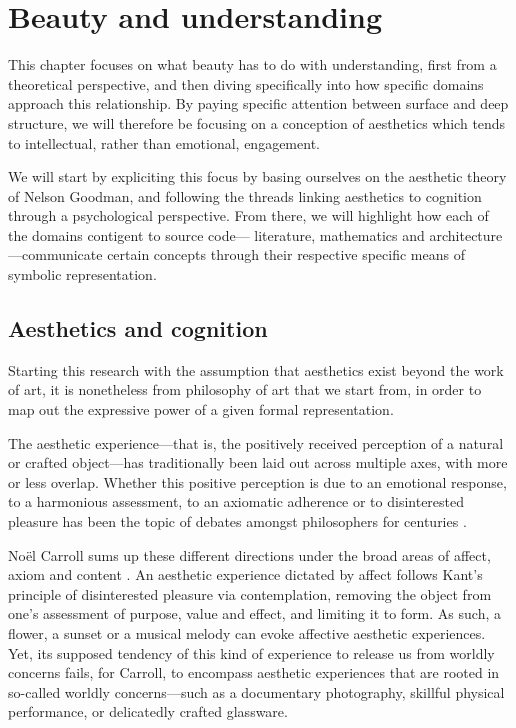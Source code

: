\chapter{Beauty and understanding}
\label{chap:beauty}


This chapter focuses on what beauty has to do with understanding, first from a theoretical perspective, and then diving specifically into how specific domains approach this relationship.  By paying specific attention between surface and deep structure, we will therefore be focusing on a conception of aesthetics which tends to intellectual, rather than emotional, engagement.

We will start by expliciting this focus by basing ourselves on the aesthetic theory of Nelson Goodman, and following the threads linking aesthetics to cognition through a psychological perspective. From there, we will highlight how each of the domains contigent to source code— literature, mathematics and architecture—communicate certain concepts through their respective specific means of symbolic representation.

\section{Aesthetics and cognition}
\label{sec:aesthetic-cognition}


Starting this research with the assumption that aesthetics exist beyond the work of art, it is nonetheless from philosophy of art that we start from, in order to map out the expressive power of a given formal representation. 

The aesthetic experience—that is, the positively received perception of a natural or crafted object—has traditionally been laid out across multiple axes, with more or less overlap. Whether this positive perception is due to an emotional response, to a harmonious assessment, to an axiomatic adherence or to disinterested pleasure has been the topic of debates amongst philosophers for centuries \citep{peacocke_aesthetic_2023}.

Noël Carroll sums up these different directions under the broad areas of affect, axiom and content \citep{carroll_aesthetic_2002}. An aesthetic experience dictated by affect follows Kant's principle of disinterested pleasure via contemplation, removing the object from one's assessment of purpose, value and effect, and limiting it to form. As such, a flower, a sunset or a musical melody can evoke affective aesthetic experiences. Yet, its supposed tendency of this kind of experience to release us from worldly concerns fails, for Carroll, to encompass aesthetic experiences that are rooted in so-called worldly concerns—such as a documentary photography, skillful physical performance, or delicatedly crafted glassware.

